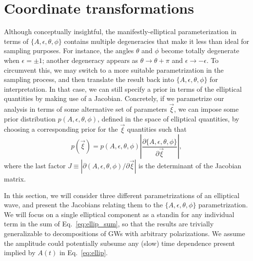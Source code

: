 \documentclass[aps,prd,twocolumn,superscriptaddress,preprintnumbers,floatfix,nofootinbib]{revtex4-2}
\begin{document}



\section{Coordinate transformations}

Although conceptually insightful, the manifestly-elliptical parameterization in terms of $\{A, \epsilon, \theta, \phi\}$ contains multiple degeneracies that make it less than ideal for sampling purposes.
For instance, the angles $\theta$ and $\phi$ become totally degenerate when $\epsilon = \pm 1$; another degeneracy appears as $\theta \to \theta + \pi$ and $\epsilon \to - \epsilon$.
To circumvent this, we may switch to a more suitable parametrization in the sampling process, and then translate the result back into $\{A, \epsilon, \theta, \phi\}$ for interpretation.
In that case, we can still specify a prior in terms of the elliptical quantities by making use of a Jacobian.
Concretely, if we parametrize our analysis in terms of some alternative set of parameters $\vec{\xi}$, we can impose some prior distribution $p({A, \epsilon, \theta, \phi})$, defined in the space of elliptical quantities, by choosing a corresponding prior for the $\vec{\xi}$ quantities such that
\begin{equation}
p \left( \vec{\xi} \right) = p \left( A, \epsilon, \theta, \phi \right) \left| \frac{\partial \{A, \epsilon, \theta, \phi\}}{\partial \vec{\xi}} \right| ,
\end{equation}
where the last factor $J \equiv | \partial (A, \epsilon, \theta, \phi)/\partial \vec{\xi} |$ is the determinant of the Jacobian matrix.


In this section, we will consider three different parametrizations of an elliptical wave, and present the Jacobians relating them to the $\{A, \epsilon, \theta, \phi\}$ parametrization.
We will focus on a single elliptical component as a standin for any individual term in the sum of Eq.~\eqref{eq:ellip_sum}, so that the results are trivially generalizable to decompositions of GWs with arbitrary polarizations.
We assume the amplitude could potentially subsume any (slow) time dependence present implied by $A(t)$ in Eq.~\eqref{eq:ellip}.
\end{document}
